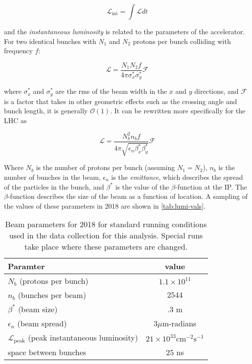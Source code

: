 \begin{equation}
\mathcal{L}_{\textrm{int}} = \int \mathcal{L} dt
\end{equation}

and the \emph{instantaneous luminosity} is related to the parameters of the accelerator. For two identical bunches with $N_1$ and $N_2$ protons per bunch colliding with frequency $f$:

\begin{equation}
\mathcal{L} = \frac{N_1 N_2 f}{4\pi \sigma_x^* \sigma_y^*} \mathcal{F}
\end{equation}


where $\sigma_x^*$ and  $\sigma_y^*$ are the \ac{rms} of the beam width in the $x$ and $y$ directions, and $\mathcal{F}$ is a factor that takes in other geometric effects such as the crossing angle and bunch length, it is generally $\mathcal{O}(1)$. It can be rewritten more specifically for the \ac{LHC} as

\begin{equation}
\mathcal{L} = \frac{N_b^2 n_b f }{4\pi \sqrt{\epsilon_n \beta^*_x \beta^*_y}}\mathcal{F}
\end{equation}

Where $N_b$ is the number of protons per bunch (assuming $N_1 = N_2$), $n_b$ is the number of bunches in the beam, $\epsilon_n$ is the \emph{emittance}, which describes the spread of the particles in the bunch, and $\beta^*$ is the value of the $\beta$-function at the \ac{IP}. The $\beta$-function describes the size of the beam as a function of location. A sampling of the values of these parameters in 2018 are shown in \autoref{tab:lumi-vals}.


\begin{table}
\centering
\begin{tabular}{lc}
\hline
Paramter & value  \\
\hline
$N_b$ (protons per bunch)                                           & $1.1 \times 10^{11}$   \\
$n_b$ (bunches per beam)                                            & $2544$   \\
$\beta^*$ (beam size)                                               & $.3$ m   \\
$\epsilon_n$ (beam spread)                                          & $3 \mu$m-radians   \\
$\mathcal{L}_{\textrm{peak}}$ (peak instantaneous luminosity)       & $21 \times 10^{33} \textrm{cm}^{-2}\textrm{s}^{-1}$   \\
space between bunches                                               & $25$ ns   \\
\hline
\end{tabular}
\caption{Beam parameters for 2018 for standard running conditions used in the data collection for this analysis. Special runs take place where these parameters are changed.}
\label{tab:lumi-vals}
\end{table}

